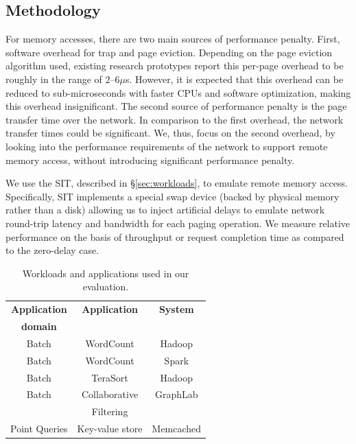 \subsection{Methodology}
\label{ssec:rmethod}
For memory accesses, there are two main sources of performance penalty. First, software overhead for trap and page eviction. Depending on the page eviction algorithm used, existing research prototypes report this per-page overhead to be roughly in the range of $2$--$6\mu$s. However, it is expected that this overhead can be reduced to sub-microseconds with faster CPUs and software optimization, making this overhead insignificant. The second source of performance penalty is the page transfer time over the network. In comparison to the first overhead, the network transfer times could be significant. We, thus, focus on the second overhead, by looking into the performance requirements of the network to support remote memory access, without introducing significant performance penalty.

We use the SIT, described in \S\ref{sec:workloads}, to emulate remote memory access. Specifically, SIT implements a special swap device (backed by physical memory rather than a disk) allowing us to inject artificial delays to emulate network round-trip latency and bandwidth for each paging operation. We measure relative performance on the basis of throughput or request completion time as compared to the zero-delay case. 

%
\begin{table}
	\centering
	\caption{\small{Workloads and applications used in our evaluation. }}
	\label{tab:workloads}
	\vspace{0.1in}
  \begin{tabular}{c|c|c}
	  \hline
		\textbf{Application} & \textbf{Application} & \textbf{System}\\
		\textbf{domain} & \textbf{} & \textbf{}\\\hline \hline
    Batch & WordCount & Hadoop\\\hline
    Batch & WordCount & Spark\\\hline
    Batch & TeraSort & Hadoop\\\hline
    Batch & Collaborative & GraphLab\\
     & Filtering & \\\hline
    Point Queries & Key-value store & Memcached\\\hline
    \hline
\end{tabular}
\end{table}

